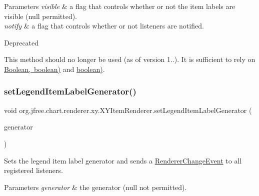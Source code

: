 \begin{DoxyParams}{Parameters}
{\em visible} & a flag that controls whether or not the item labels are visible ({\ttfamily null} permitted). \\
\hline
{\em notify} & a flag that controls whether or not listeners are notified.\\
\hline
\end{DoxyParams}
\begin{DoxyRefDesc}{Deprecated}
\item[\mbox{\hyperlink{deprecated__deprecated000226}{Deprecated}}]This method should no longer be used (as of version 1..). It is sufficient to rely on \mbox{\hyperlink{}{Boolean, boolean)}} and \mbox{\hyperlink{interfaceorg_1_1jfree_1_1chart_1_1renderer_1_1xy_1_1_x_y_item_renderer_a33f1c11ed3784b904496987e9063f650}{boolean)}}. \end{DoxyRefDesc}
\mbox{\label{interfaceorg_1_1jfree_1_1chart_1_1renderer_1_1xy_1_1_x_y_item_renderer_ad57737bb623ca88dec6dd3fb90a3e8fe}} 
\subsubsection{\texorpdfstring{set\+Legend\+Item\+Label\+Generator()}{setLegendItemLabelGenerator()}}
{\footnotesize\ttfamily void org.\+jfree.\+chart.\+renderer.\+xy.\+X\+Y\+Item\+Renderer.\+set\+Legend\+Item\+Label\+Generator (\begin{DoxyParamCaption}\item[{\mbox{\hyperlink{interfaceorg_1_1jfree_1_1chart_1_1labels_1_1_x_y_series_label_generator}{X\+Y\+Series\+Label\+Generator}}}]{generator }\end{DoxyParamCaption})}

Sets the legend item label generator and sends a \mbox{\hyperlink{}{Renderer\+Change\+Event}} to all registered listeners.


\begin{DoxyParams}{Parameters}
{\em generator} & the generator ({\ttfamily null} not permitted). \\
\hline
\end{DoxyParams}


